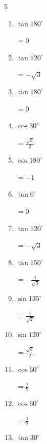 \begin{multicols}{5}
\begin{enumerate}
        $\displaystyle =\frac{1}{2}$

  \item $\displaystyle \tan{180^\circ}$

        $\displaystyle =0$

  \item $\displaystyle \tan{120^\circ}$

        $\displaystyle =-\sqrt{3}$

  \item $\displaystyle \tan{180^\circ}$

        $\displaystyle =0$

\columnbreak %

  \item $\displaystyle \cos{30^\circ}$

        $\displaystyle =\frac{\sqrt{3}}{2}$

  \item $\displaystyle \cos{180^\circ}$

        $\displaystyle =-1$

  \item $\displaystyle \tan{0^\circ}$

        $\displaystyle =0$

  \item $\displaystyle \tan{120^\circ}$

        $\displaystyle =-\sqrt{3}$

  \item $\displaystyle \tan{150^\circ}$

        $\displaystyle =-\frac{1}{\sqrt{3}}$

  \item $\displaystyle \sin{135^\circ}$

        $\displaystyle =\frac{1}{\sqrt{2}}$

  \item $\displaystyle \sin{120^\circ}$

        $\displaystyle =\frac{\sqrt{3}}{2}$

  \item $\displaystyle \cos{60^\circ}$

        $\displaystyle =\frac{1}{2}$

  \item $\displaystyle \cos{60^\circ}$

        $\displaystyle =\frac{1}{2}$

  \item $\displaystyle \tan{30^\circ}$


\end{enumerate}
\end{multicols}
